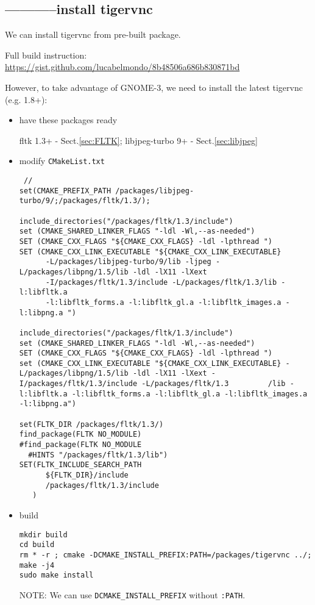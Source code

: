 \subsection{-----------install tigervnc}

We can install tigervnc from pre-built package.

Full build instruction:
\url{https://gist.github.com/lucabelmondo/8b48506a686b830871bd}

However, to take advantage of GNOME-3, we need to install the latest tigervnc
(e.g. 1.8+):
\begin{itemize}
  
  \item have these packages ready
  
  fltk 1.3+ - Sect.\ref{sec:FLTK}; libjpeg-turbo 9+ - Sect.\ref{sec:libjpeg}
  
  \item modify \verb!CMakeList.txt! 
  
  
\begin{verbatim}
 //  
set(CMAKE_PREFIX_PATH /packages/libjpeg-turbo/9/;/packages/fltk/1.3/);

include_directories("/packages/fltk/1.3/include")
set (CMAKE_SHARED_LINKER_FLAGS "-ldl -Wl,--as-needed")
SET (CMAKE_CXX_FLAGS "${CMAKE_CXX_FLAGS} -ldl -lpthread ")
SET (CMAKE_CXX_LINK_EXECUTABLE "${CMAKE_CXX_LINK_EXECUTABLE}
      -L/packages/libjpeg-turbo/9/lib -ljpeg -L/packages/libpng/1.5/lib -ldl -lX11 -lXext
      -I/packages/fltk/1.3/include -L/packages/fltk/1.3/lib -l:libfltk.a
      -l:libfltk_forms.a -l:libfltk_gl.a -l:libfltk_images.a -l:libpng.a ")

include_directories("/packages/fltk/1.3/include")
set (CMAKE_SHARED_LINKER_FLAGS "-ldl -Wl,--as-needed")
SET (CMAKE_CXX_FLAGS "${CMAKE_CXX_FLAGS} -ldl -lpthread ")
set (CMAKE_CXX_LINK_EXECUTABLE "${CMAKE_CXX_LINK_EXECUTABLE} -L/packages/libpng/1.5/lib -ldl -lX11 -lXext -I/packages/fltk/1.3/include -L/packages/fltk/1.3         /lib -l:libfltk.a -l:libfltk_forms.a -l:libfltk_gl.a -l:libfltk_images.a -l:libpng.a")

set(FLTK_DIR /packages/fltk/1.3/)
find_package(FLTK NO_MODULE)
#find_package(FLTK NO_MODULE
  #HINTS "/packages/fltk/1.3/lib")
SET(FLTK_INCLUDE_SEARCH_PATH
      ${FLTK_DIR}/include
      /packages/fltk/1.3/include
   )

\end{verbatim}

  \item build

\begin{verbatim}
mkdir build
cd build
rm * -r ; cmake -DCMAKE_INSTALL_PREFIX:PATH=/packages/tigervnc ../; make -j4
sudo make install 
\end{verbatim}
NOTE: We can use \verb!DCMAKE_INSTALL_PREFIX! without \verb!:PATH!.
      
\end{itemize} 

